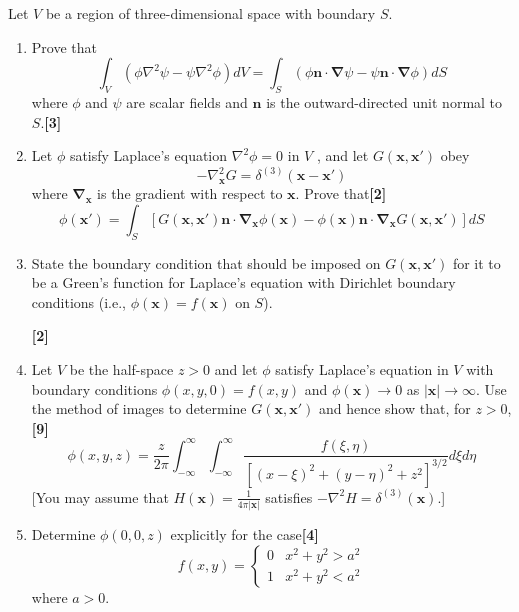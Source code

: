 \documentclass[a4paper]{article}
\begin{document}
\begin{qns}
Let $V$ be a region of three-dimensional space with boundary $S$.
\begin{enumerate}[label=(\alph*)]
\item Prove that
$$\int_V(\phi\nabla^2\psi-\psi\nabla^2\phi)dV=\int_S(\phi\mathbf{n}\cdot\boldsymbol{\nabla}\psi-\psi\mathbf{n}\cdot\boldsymbol{\nabla}\phi)dS$$
where $\phi$ and $\psi$ are scalar fields and $\mathbf{n}$ is the outward-directed unit normal to $S$.\hfill\textbf{[3]}
\item Let $\phi$ satisfy Laplace’s equation $\nabla^2\phi=0$ in $V$ , and let $G(\mathbf{x},\mathbf{x'})$ obey
$$-\nabla^2_{\mathbf{x}}G=\delta^{(3)}(\mathbf{x}-\mathbf{x'})$$
where $\boldsymbol{\nabla}_{\mathbf{x}}$ is the gradient with respect to $\mathbf{x}$. Prove that\hfill\textbf{[2]}
$$\phi(\mathbf{x'})=\int_S[G(\mathbf{x},\mathbf{x'})\mathbf{n}\cdot\boldsymbol{\nabla}_{\mathbf{x}}\phi(\mathbf{x})-\phi(\mathbf{x})\mathbf{n}\cdot\boldsymbol{\nabla}_{\mathbf{x}}G(\mathbf{x},\mathbf{x'})]dS$$
\item State the boundary condition that should be imposed on $G(\mathbf{x}, \mathbf{x'})$ for it to be a Green’s function for Laplace’s equation with Dirichlet boundary conditions (i.e., $\phi(\mathbf{x}) = f(\mathbf{x})$ on $S$).

\hfill\textbf{[2]}
\item Let $V$ be the half-space $z > 0$ and let $\phi$ satisfy Laplace’s equation in $V$ with boundary conditions $\phi(x, y, 0) = f(x, y)$ and $\phi(\mathbf{x})\rightarrow0$ as $|\mathbf{x}|\rightarrow\infty$. Use the method of images to determine $G(\mathbf{x}, \mathbf{x'})$ and hence show that, for $z > 0$,\hfill\textbf{[9]}
$$\phi(x,y,z)=\frac{z}{2\pi}\int_{-\infty}^\infty\int_{-\infty}^\infty\frac{f(\xi,\eta)}{[(x-\xi)^2+(y-\eta)^2+z^2]^{3/2}}d\xi d\eta$$
[You may assume that $H(\mathbf{x}) = \frac{1}{4\pi|\mathbf{x}|}$ satisfies $-\nabla^2H=\delta^{(3)}(\mathbf{x})$.]
\item Determine $\phi(0, 0, z)$ explicitly for the case\hfill\textbf{[4]}
$$f(x,y)=
\left\{
        \begin{array}{ll}
      0 & x^2+y^2>a^2 \\
      1 & x^2+y^2<a^2
        \end{array}
    \right.$$
where $a > 0$.
\end{enumerate}
\end{qns}
\newpage
\end{document}
